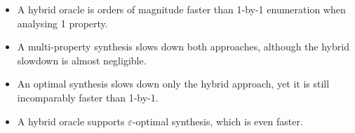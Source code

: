 \begin{itemize}
    \item A hybrid oracle is orders of magnitude faster than 1-by-1 enumeration when analysing 1 property.
    \item A multi-property synthesis slows down both approaches, although the hybrid slowdown is almost negligible.
    \item An optimal synthesis slows down only the hybrid approach, yet it is still incomparably faster than 1-by-1.
    \item A hybrid oracle supports $\varepsilon$-optimal synthesis, which is even faster.
\end{itemize}